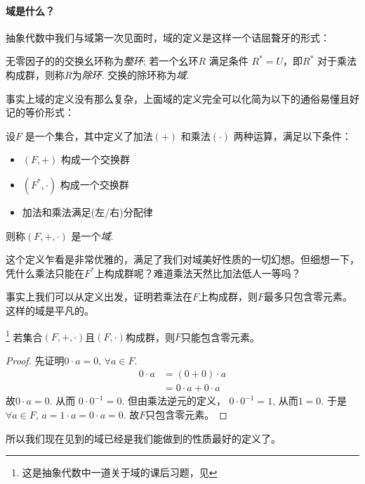 \paragraph{域是什么？}

抽象代数中我们与域第一次见面时，域的定义是这样一个诘屈聱牙的形式：
\begin{definition}
    无零因子的的交换幺环称为\emph{整环}; 若一个幺环\(R\) 满足条件
    \(R^{*}=U\)，即\(R^{*}\) 对于乘法构成群，则称\(R\)为\emph{除环}. 交换的除环称为\emph{域}.
\end{definition}
事实上域的定义没有那么复杂，上面域的定义完全可以化简为以下的通俗易懂且好记的等价形式：
\begin{definition}
    设\(F\) 是一个集合，其中定义了加法\((+)\) 和乘法\((\cdot)\) 两种运算，满足以下条件：
    \begin{itemize}
        \item \((F, +)\) 构成一个交换群
        \item \((F^{*}, \cdot)\) 构成一个交换群
        \item 加法和乘法满足(左/右)分配律
    \end{itemize}
    则称\((F, +, \cdot)\) 是一个\emph{域}.
\end{definition}

这个定义乍看是非常优雅的，满足了我们对域美好性质的一切幻想。但细想一下，凭什么乘法只能在\(F^{*}\)上构成群呢？难道乘法天然比加法低人一等吗？

事实上我们可以从定义出发，证明若乘法在\(F\)上构成群，则\(F\)最多只包含零元素。这样的域是平凡的。

\begin{theorem}\footnote{这是抽象代数中一道关于域的课后习题，见}
    若集合\((F, +, \cdot)\)且\((F,\cdot)\)构成群，则\(F\)只能包含零元素。
\end{theorem}
\begin{proof}
    先证明\(0 \cdot a=0\), \(\forall a \in F\).
    \begin{align*}
        0 \cdot a &= (0+0) \cdot a\\
        &= 0 \cdot a + 0 \cdot a
    \end{align*}
    故\(0 \cdot a=0\). 从而 \(0\cdot 0^{-1}=0\).
    但由乘法逆元的定义， \(0 \cdot 0^{-1}=1\), 从而\(1=0\).
    于是\(\forall a \in F\), \(a=1 \cdot a=0 \cdot a=0\).
    故\(F\)只包含零元素。
\end{proof}

所以我们现在见到的域已经是我们能做到的性质最好的定义了。

